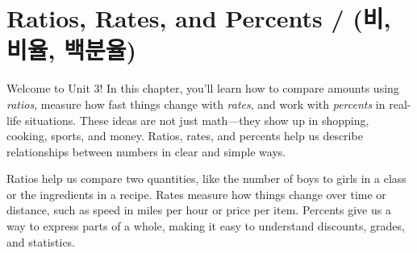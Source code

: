 \newpage
\chapter{Ratios, Rates, and Percents / \kr(비, 비율, 백분율)}

Welcome to Unit 3! In this chapter, you'll learn how to compare 
amounts using \emph{ratios}, measure how fast things change with 
\emph{rates}, and work with \emph{percents} in real-life situations. 
These ideas are not just math—they show up in shopping, cooking, 
sports, and money. Ratios, rates, and percents help us describe 
relationships between numbers in clear and simple ways.

Ratios help us compare two quantities, like the number of boys to 
girls in a class or the ingredients in a recipe. Rates measure 
how things change over time or distance, such as speed in miles 
per hour or price per item. Percents give us a way to express 
parts of a whole, making it easy to understand discounts, grades, 
and statistics.


% 
% 
% 
% 
% 
% 